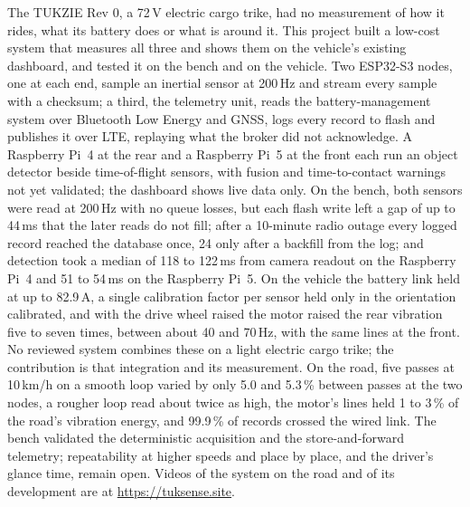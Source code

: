 \documentclass[a4paper,11pt]{report}
\begin{document}
{%
The TUKZIE Rev 0, a 72\,V electric cargo trike, had no measurement of how it rides, what its battery does or what is around it. This project built a low-cost system that measures all three and shows them on the vehicle's existing dashboard, and tested it on the bench and on the vehicle. Two ESP32-S3 nodes, one at each end, sample an inertial sensor at 200\,Hz and stream every sample with a checksum; a third, the telemetry unit, reads the battery-management system over Bluetooth Low Energy and GNSS, logs every record to flash and publishes it over LTE, replaying what the broker did not acknowledge. A Raspberry Pi~4 at the rear and a Raspberry Pi~5 at the front each run an object detector beside time-of-flight sensors, with fusion and time-to-contact warnings not yet validated; the dashboard shows live data only. On the bench, both sensors were read at 200\,Hz with no queue losses, but each flash write left a gap of up to 44\,ms that the later reads do not fill; after a 10-minute radio outage every logged record reached the database once, 24 only after a backfill from the log; and detection took a median of 118 to 122\,ms from camera readout on the Raspberry Pi~4 and 51 to 54\,ms on the Raspberry Pi~5. On the vehicle the battery link held at up to 82.9\,A, a single calibration factor per sensor held only in the orientation calibrated, and with the drive wheel raised the motor raised the rear vibration five to seven times, between about 40 and 70\,Hz, with the same lines at the front. No reviewed system combines these on a light electric cargo trike; the contribution is that integration and its measurement. On the road, five passes at 10\,km/h on a smooth loop varied by only 5.0 and 5.3\,\% between passes at the two nodes, a rougher loop read about twice as high, the motor's lines held 1 to 3\,\% of the road's vibration energy, and 99.9\,\% of records crossed the wired link. The bench validated the deterministic acquisition and the store-and-forward telemetry; repeatability at higher speeds and place by place, and the driver's glance time, remain open. Videos of the system on the road and of its development are at \url{https://tuksense.site}.


\newpage


\newpage
\tableofcontents
\vfill
{}

}
\end{document}
